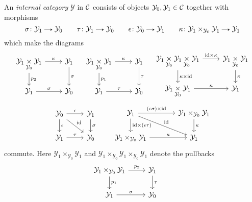 \begin{appendices}
  \renewcommand{\Y}{\mathcal{Y}}
  \renewcommand{\Z}{\mathcal{Z}}
  \begin{definitions}
    An \emph{internal category} $\Y$ in $\mathcal{C}$ consists of objects
    $\Y_0, \Y_1 \in \C$ together with morphisms
    \[
    \sigma \c \Y_1 \to \Y_0 \qquad
    \tau \c \Y_1 \to \Y_0 \qquad
    \epsilon \c \Y_0 \to \Y_1 \qquad
    \kappa \c \Y_1 \times_{\Y_0} \Y_1 \to \Y_1
    \]
    which make the diagrams
    \[
    \begin{tikzcd}
      \Y_1 \underset{\Y_0}{\times} \Y_1 \ar[r, "\kappa"] \ar[d, "p_2"]
      & \Y_1 \ar[d, "\sigma"] \\ \Y_1 \ar[r, "\sigma"] & \Y_0
    \end{tikzcd}
    \quad
    \begin{tikzcd}
      \Y_1 \underset{\Y_0}{\times} \Y_1 \ar[r, "\kappa"] \ar[d, "p_1"]
      & \Y_1 \ar[d, "\tau"] \\ \Y_1 \ar[r, "\tau"] & \Y_0
    \end{tikzcd}
    \quad
    \begin{tikzcd}
      \Y_1 \underset{\Y_0}{\times} \Y_1 \underset{\Y_0}{\times} \Y_1
      \ar[r, "\id \times \kappa"] \ar[d, "\kappa \times \id"] & \Y_1
      \underset{\Y_0}{\times} \Y_1 \ar[d, "\kappa"] \\ \Y_1
      \underset{\Y_0}{\times} \Y_1 \ar[r, "\kappa"] & \Y_1
    \end{tikzcd}
    \]
    \[
    \begin{tikzcd}
      \Y_0 \ar[r, "\epsilon"] \ar[d, "\epsilon"] \ar[rd, "\id"] & \Y_1
      \ar[d, "\sigma"] \\ \Y_1 \ar[r, "\tau"] & \Y_0
    \end{tikzcd}
    \qquad
    \begin{tikzcd}[column sep = large]
      \Y_1 \ar[r, "(\epsilon\sigma) \times \id"] \ar[d, "\id \times
      (\epsilon\tau)"] \ar[rd, "\id"] & \Y_1 \times_{\Y_0}
      \Y_1 \ar[d, "\kappa"] \\ \Y_1 \times_{\Y_0} \Y_1
      \ar[r, "\kappa"] & \Y_1
    \end{tikzcd}
    \]
    commute. Here $\Y_1 \times_{\Y_0} \Y_1$ and $\Y_1 \times_{\Y_0}
    \Y_1 \times_{\Y_0} \Y_1$ denote the pullbacks
    \[
    \begin{tikzcd}
      \Y_1 \times_{\Y_0} \Y_1 \ar[r, "p_2"] \ar[d, "p_1"] & \Y_1
      \ar[d, "\tau"] \\ \Y_1 \ar[r, "\sigma"] & \Y_0
    \end{tikzcd}
    \qquad
    \begin{tikzcd}

\end{tikzcd}\]
\end{definitions}
\end{appendices}
